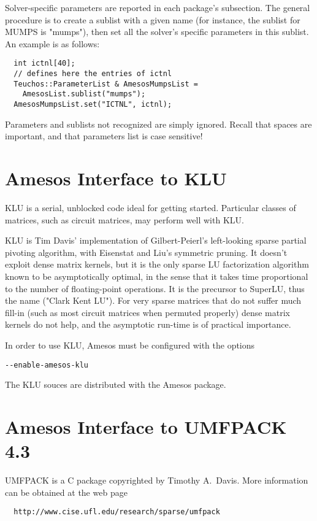 \documentclass[11pt]{SANDreport}
\begin{document}
Solver-specific parameters are reported in each package's subsection.
The general procedure is to create a sublist with a given name (for
instance, the sublist for MUMPS is "mumps"), then set all the
solver's specific parameters in this sublist. An example is as follows:
\begin{verbatim}
  int ictnl[40];
  // defines here the entries of ictnl
  Teuchos::ParameterList & AmesosMumpsList = 
    AmesosList.sublist("mumps");
  AmesosMumpsList.set("ICTNL", ictnl);
\end{verbatim}
Parameters and sublists not recognized are simply ignored. Recall that
spaces are important, and that parameters list is case sensitive!


\section{Amesos Interface to KLU}
\label{sec:klu}

KLU is a serial, unblocked code ideal for getting started. Particular
classes of matrices, such as circuit matrices, may perform well with KLU.

KLU is Tim Davis' implementation of Gilbert-Peierl's left-looking sparse
partial pivoting algorithm, with Eisenstat and Liu's symmetric pruning.
It doesn't exploit dense matrix kernels, but it is the only sparse LU
factorization algorithm known to be asymptotically optimal, in the sense
that it takes time proportional to the number of floating-point
operations. It is the precursor to SuperLU, thus the name ("Clark Kent
LU"). For very sparse matrices that do not suffer much fill-in (such as
most circuit matrices when permuted properly) dense matrix kernels do
not help, and the asymptotic run-time is of practical importance.

\smallskip

In order to use KLU, Amesos must be configured with the options
\begin{verbatim}
--enable-amesos-klu
\end{verbatim}
The KLU souces are distributed with the Amesos package.


\section{Amesos Interface to UMFPACK 4.3}
\label{sec:umfpack}

UMFPACK is a C package copyrighted by Timothy A.~Davis. More information
can be obtained at the web page
\begin{verbatim}
  http://www.cise.ufl.edu/research/sparse/umfpack
\end{verbatim}
\end{document}

